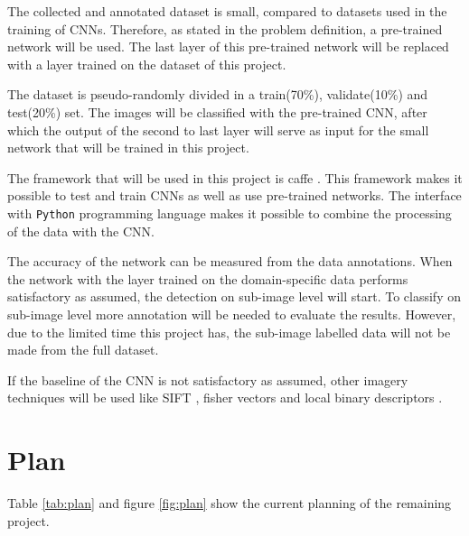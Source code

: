 \documentclass[a4paper, 11pt]{article}
\begin{document}
The collected and annotated dataset is small, compared to datasets used in the training of CNNs. Therefore, as stated in the problem definition, a pre-trained network will be used. The last layer of this pre-trained network will be replaced with a layer trained on the dataset of this project.

The dataset is pseudo-randomly divided in a train(70\%), validate(10\%) and test(20\%) set. The images will be classified with the pre-trained CNN, after which the output of the second to last layer will serve as input for the small network that will be trained in this project.

The framework that will be used in this project is caffe \citet{jia2014caffe}. This framework makes it possible to test and train CNNs as well as use pre-trained networks. The interface with \texttt{Python} programming language makes it possible to combine the processing of the data with the CNN.

The accuracy of the network can be measured from the data annotations. When the network with the layer trained on the domain-specific data performs satisfactory as assumed, the detection on sub-image level will start. To classify on sub-image level more annotation will be needed to evaluate the results. However, due to the limited time this project has, the sub-image labelled data will not be made from the full dataset.

If the baseline of the CNN is not satisfactory as assumed, other imagery techniques will be used like SIFT \citet{ai2010color}, fisher vectors \citet{sanchez2013image} and local binary descriptors \citet{zhang2010local}.


\section{Plan}
Table \ref{tab:plan} and figure \ref{fig:plan} show the current planning of the remaining project.
\end{document}
